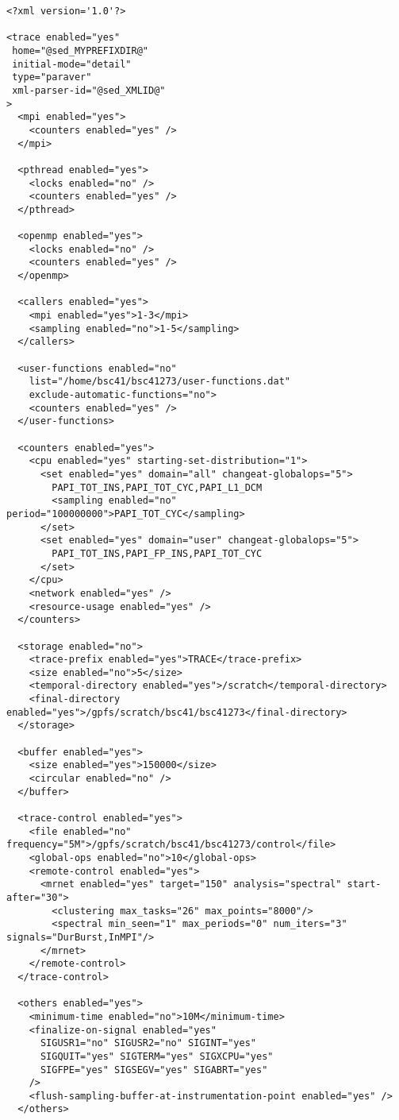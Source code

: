 \begin{verbatim}
<?xml version='1.0'?>

<trace enabled="yes"
 home="@sed_MYPREFIXDIR@"
 initial-mode="detail"
 type="paraver"
 xml-parser-id="@sed_XMLID@"
>
  <mpi enabled="yes">
    <counters enabled="yes" />
  </mpi>

  <pthread enabled="yes">
    <locks enabled="no" />
    <counters enabled="yes" />
  </pthread>

  <openmp enabled="yes">
    <locks enabled="no" />
    <counters enabled="yes" />
  </openmp>

  <callers enabled="yes">
    <mpi enabled="yes">1-3</mpi>
    <sampling enabled="no">1-5</sampling>
  </callers>

  <user-functions enabled="no"
    list="/home/bsc41/bsc41273/user-functions.dat"
    exclude-automatic-functions="no">
    <counters enabled="yes" />
  </user-functions>

  <counters enabled="yes">
    <cpu enabled="yes" starting-set-distribution="1">
      <set enabled="yes" domain="all" changeat-globalops="5">
        PAPI_TOT_INS,PAPI_TOT_CYC,PAPI_L1_DCM
        <sampling enabled="no" period="100000000">PAPI_TOT_CYC</sampling>
      </set>
      <set enabled="yes" domain="user" changeat-globalops="5">
        PAPI_TOT_INS,PAPI_FP_INS,PAPI_TOT_CYC
      </set>
    </cpu>
    <network enabled="yes" />
    <resource-usage enabled="yes" />
  </counters>

  <storage enabled="no">
    <trace-prefix enabled="yes">TRACE</trace-prefix>
    <size enabled="no">5</size>
    <temporal-directory enabled="yes">/scratch</temporal-directory>
    <final-directory enabled="yes">/gpfs/scratch/bsc41/bsc41273</final-directory>
  </storage>

  <buffer enabled="yes">
    <size enabled="yes">150000</size>
    <circular enabled="no" />
  </buffer>

  <trace-control enabled="yes">
    <file enabled="no" frequency="5M">/gpfs/scratch/bsc41/bsc41273/control</file>
    <global-ops enabled="no">10</global-ops>
    <remote-control enabled="yes">
      <mrnet enabled="yes" target="150" analysis="spectral" start-after="30">
        <clustering max_tasks="26" max_points="8000"/>
        <spectral min_seen="1" max_periods="0" num_iters="3" signals="DurBurst,InMPI"/>
      </mrnet>
    </remote-control>
  </trace-control> 

  <others enabled="yes">
    <minimum-time enabled="no">10M</minimum-time>
    <finalize-on-signal enabled="yes" 
      SIGUSR1="no" SIGUSR2="no" SIGINT="yes"
      SIGQUIT="yes" SIGTERM="yes" SIGXCPU="yes"
      SIGFPE="yes" SIGSEGV="yes" SIGABRT="yes"
    />
    <flush-sampling-buffer-at-instrumentation-point enabled="yes" />
  </others>


\end{verbatim}
